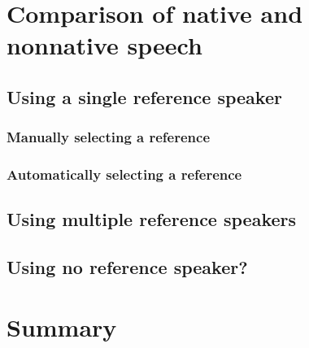 \section{Comparison of native and nonnative speech}
		\cite{Probst2002}
	\subsection{Using a single reference speaker}
		\subsubsection{Manually selecting a reference}
		\subsubsection{Automatically selecting a reference}
	\subsection{Using multiple reference speakers}
	\subsection{Using no reference speaker?}
		\cite{Duong2011}

		
\section{Summary}